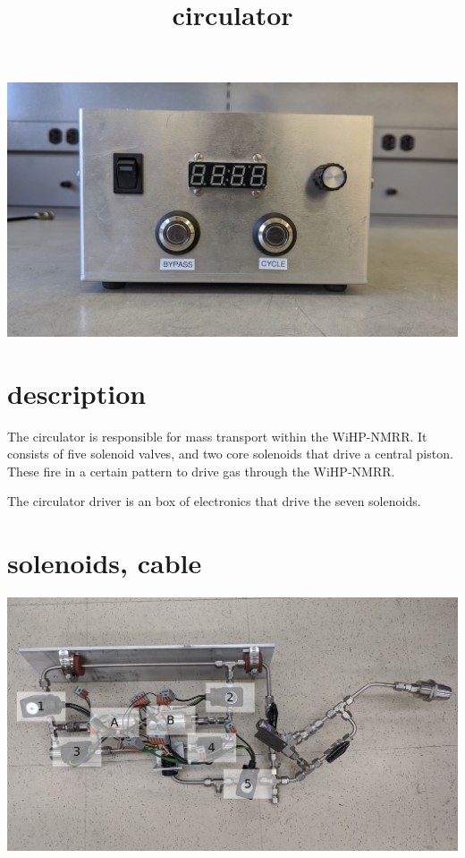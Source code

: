 \documentclass{manual}
\title{circulator}
\begin{document}
\maketitle

\vspace*{\fill}
\begin{center}
  \includegraphics[width=\linewidth]{../pictures/2019-10-23_114104}
\end{center}
\vspace*{\fill}

\section{description}

The circulator is responsible for mass transport within the WiHP-NMRR.
It consists of five solenoid valves, and two core solenoids that drive a central piston.
These fire in a certain pattern to drive gas through the WiHP-NMRR.

The circulator driver is an box of electronics that drive the seven solenoids.

\section{solenoids, cable}

\begin{center}
  \includegraphics[width=\linewidth]{./figures/solenoids}
\end{center}
\end{document}
